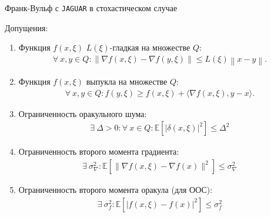 \documentclass{beamer}
\begin{document}
\begin{frame}{Франк-Вульф с \texttt{JAGUAR} в стохастическом случае}

    Допущения:
    \small{
        \begin{enumerate}
            \item Функция $f(x, \xi)$ $L(\xi)$-гладкая на множестве $Q$: 
                \begin{align*}
                    \forall\ x, y \in Q: \left\| \nabla f(x, \xi) - \nabla f(y, \xi) \right\| \leq L(\xi) \left\|x-y\right\|.
                \end{align*}
            \item Функция $f(x, \xi)$ выпукла на множестве $Q$:
                \begin{align*}
                    \forall\ x, y \in Q: f(y, \xi) \geq f(x, \xi) + \langle \nabla f(x, \xi), y - x \rangle.
                \end{align*}
            \item Ограниченность оракульного шума:
                \begin{align*}
                    \exists\ \Delta > 0: \forall\ x \in Q: \mathbb{E} \left[ |\delta(x, \xi)|^2 \right] \leq \Delta^2
                \end{align*}
            \item Ограниченность второго момента градиента:
                \begin{align*}
                    \exists\ \sigma^2_{\nabla}: \mathbb{E} \left[ \| \nabla f(x, \xi) - \nabla f(x) \|^2 \right] \leq \sigma^2_{\nabla}
                \end{align*}
            \item Ограниченность второго момента оракула (для ООС):
                \begin{align*}
                    \exists\ \sigma^2_{f}: \mathbb{E} \left[ \left|f(x, \xi) - f(x) \right|^2 \right] \leq \sigma^2_{f}
                \end{align*}
        \end{enumerate}
    }

\end{frame}


\end{document}
